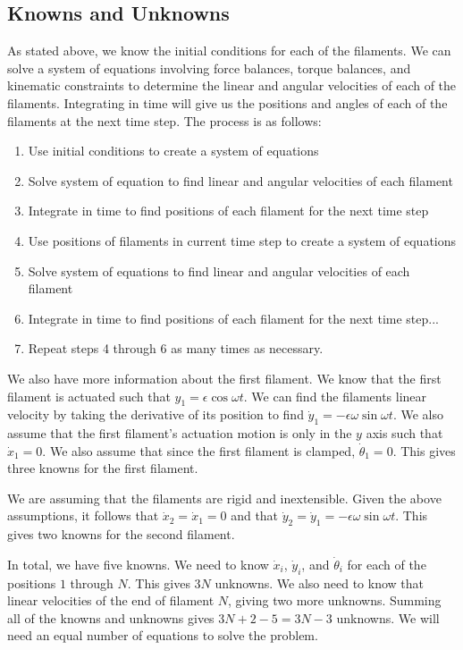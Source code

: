 \documentclass[12pt,letterpaper,titlepage]{article}
\begin{document}
\subsection{Knowns and Unknowns}
As stated above, we know the initial conditions for each of the filaments. We can solve a system of equations involving force balances, torque balances, and kinematic constraints to determine the linear and angular velocities of each of the filaments. Integrating in time will give us the positions and angles of each of the filaments at the next time step. The process is as follows:
\begin{enumerate} \itemsep -2pt
\item Use initial conditions to create a system of equations
\item Solve system of equation to find linear and angular velocities of each filament
\item Integrate in time to find positions of each filament for the next time step
\item Use positions of filaments in current time step to create a system of equations
\item Solve system of equations to find linear and angular velocities of each filament
\item Integrate in time to find positions of each filament for the next time step...
\item Repeat steps 4 through 6 as many times as necessary.
\end{enumerate}

We also have more information about the first filament. We know that the first filament is actuated such that $y_1 = \epsilon \cos \omega t$. We can find the filaments linear velocity by taking the derivative of its position to find $\dot{y}_1 = - \epsilon \omega \sin \omega t$. We also assume that the first filament's actuation motion is only in the $y$ axis such that $\dot{x}_1 = 0$. We also assume that since the first filament is clamped, $\dot{\theta}_1 = 0$. This gives three knowns for the first filament.

We are assuming that the filaments are rigid and inextensible. Given the above assumptions, it follows that $\dot{x}_2 = \dot{x}_1 = 0$ and that $\dot{y}_2 = \dot{y}_1 = - \epsilon \omega \sin \omega t$. This gives two knowns for the second filament.

In total, we have five knowns. We need to know $\dot{x}_i$, $\dot{y}_i$, and $\dot{\theta}_i$ for each of the positions $1$ through $N$. This gives $3N$ unknowns. We also need to know that linear velocities of the end of filament $N$, giving two more unknowns. Summing all of the knowns and unknowns gives $3N + 2 - 5 = 3N - 3$ unknowns. We will need an equal number of equations to solve the problem.
\end{document}
